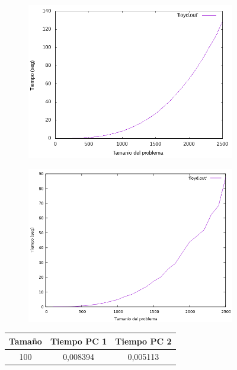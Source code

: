 \documentclass[12pt,spanish]{article}
\begin{document}
\begin{figure}[H]
\centering
\begin{subfigure}[b]{0.45\textwidth}
\includegraphics[scale=0.45]{empirica_floyd.png}
\caption{}
\end{subfigure}
\quad
\begin{subfigure}[b]{0.45\textwidth}
\includegraphics[scale=0.45]{empirica_floyd_2.png}
\caption{}
\end{subfigure}
\begin{tabular}{|c|c|c|}
\hline
\textbf{Tamaño} & \textbf{Tiempo PC 1} & \textbf{Tiempo PC 2} \\
\hline
100 & 0,008394 & 0,005113\\

\end{tabular}
\end{figure}
\end{document}
